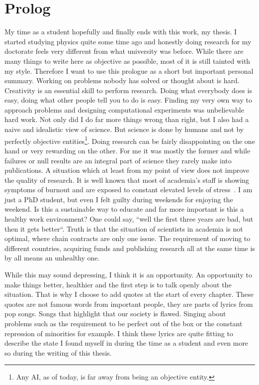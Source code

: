 \section*{Prolog}
\label{sec:prolog}
My time as a student hopefully and finally ends with this work, my thesis.
I started studying physics quite some time ago and honestly doing research for my doctorate feels very different from what university was before.
While there are many things to write here as objective as possible, most of it is still tainted with my style.
Therefore I want to use this prologue as a short but important personal summary.
Working on problems nobody has solved or thought about is hard.
Creativity is an essential skill to perform research.
Doing what everybody does is easy, doing what other people tell you to do is easy.
Finding my very own way to approach problems and designing computational experiments was unbelievable hard work. 
Not only did I do far more things wrong than right, but I also had a naive and idealistic view of science.
But science is done by humans and not by perfectly objective entities\footnote{Any AI, as of today, is far away from being an objective entity.}.
Doing research can be fairly disappointing on the one hand or very rewarding on the other.
For me it was mostly the former and while failures or null results are an integral part of science they rarely make into publications.
A situation which at least from my point of view does not improve the quality of research.
It is well known that most of academia's staff is showing symptoms of burnout and are exposed to constant elevated levels of stress~\cite{gewin2021pandemic, bilge2006examining, henny2014prevalence, watts2011burnout, satinsky2021systematic}.
I am just a PhD student, but even I felt guilty during weekends for enjoying the weekend.
Is this a sustainable way to educate and far more important is this a healthy work environment?
One could say, ``well the first three years are bad, but then it gets better``. 
Truth is that the situation of scientists in academia is not optimal, where chain contracts are only one issue.
The requirement of moving to different countries, acquiring funds and publishing research all at the same time is by all means an unhealthy one.

While this may sound depressing, I think it is an opportunity.
An opportunity to make things better, healthier and the first step is to talk openly about the situation.
That is why I choose to add quotes at the start of every chapter.
These quotes are not famous words from important people, they are parts of lyrics from pop songs.
Songs that highlight that our society is flawed.
Singing about problems such as the requirement to be perfect out of the box or the constant repression of minorities for example.
I think these lyrics are quite fitting to describe the state I found myself in during the time as a student and even more so during the writing of this thesis.